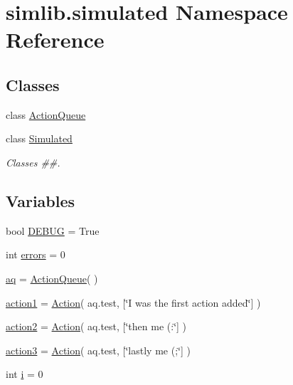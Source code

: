 \hypertarget{namespacesimlib_1_1simulated}{}\section{simlib.\+simulated Namespace Reference}
\label{namespacesimlib_1_1simulated}
\subsection*{Classes}
\begin{DoxyCompactItemize}
\item 
class \mbox{\hyperlink{classsimlib_1_1simulated_1_1_action_queue}{Action\+Queue}}
\item 
class \mbox{\hyperlink{classsimlib_1_1simulated_1_1_simulated}{Simulated}}
\begin{DoxyCompactList}\small\item\em Classes \#\#. \end{DoxyCompactList}\end{DoxyCompactItemize}
\subsection*{Variables}
\begin{DoxyCompactItemize}
\item 
bool \mbox{\hyperlink{namespacesimlib_1_1simulated_a869c9cd35f4300c21611c3493a502d2b}{D\+E\+B\+UG}} = True
\item 
int \mbox{\hyperlink{namespacesimlib_1_1simulated_a61b1e354d4de5ca84c3ef59b995f1d94}{errors}} = 0
\item 
\mbox{\hyperlink{namespacesimlib_1_1simulated_a568d0a51b773f62750b4f5f3be304e06}{aq}} = \mbox{\hyperlink{classsimlib_1_1simulated_1_1_action_queue}{Action\+Queue}}( )
\item 
\mbox{\hyperlink{namespacesimlib_1_1simulated_a2824112ce8253f4840a2f4e50bf6d08d}{action1}} = \mbox{\hyperlink{classsimlib_1_1action_1_1_action}{Action}}( aq.\+test, \mbox{[}\char`\"{}I was the first action added\char`\"{}\mbox{]} )
\item 
\mbox{\hyperlink{namespacesimlib_1_1simulated_a89b7aff90a7c400753f78d0544a57f9a}{action2}} = \mbox{\hyperlink{classsimlib_1_1action_1_1_action}{Action}}( aq.\+test, \mbox{[}\char`\"{}then me (\+:\char`\"{}\mbox{]} )
\item 
\mbox{\hyperlink{namespacesimlib_1_1simulated_accf462e21b425ff2fa68976fc5524bca}{action3}} = \mbox{\hyperlink{classsimlib_1_1action_1_1_action}{Action}}( aq.\+test, \mbox{[}\char`\"{}lastly me (;\char`\"{}\mbox{]} )
\item 
int \mbox{\hyperlink{namespacesimlib_1_1simulated_a043c73724dd23fd70be661f0357bb1cf}{i}} = 0
\end{DoxyCompactItemize}


